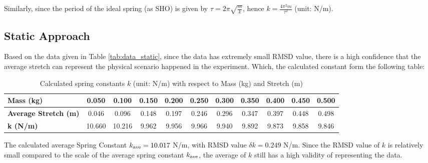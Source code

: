 \documentclass{article}
\begin{document}
Similarly, since the period of the ideal spring (as SHO) is given by $\tau=2\pi\sqrt{\frac{m}{k}}$, hence $k = \frac{4\pi^2 m}{\tau^2}$ (unit: N/m).


\subsection{Static Approach} 
Based on the data given in Table \ref{tab:data_static}, since the data has extremely small RMSD value, there is a high confidence that the average stretch can represent the physical scenario happened in the experiment. Which, the calculated constant form the following table:
\begin{table}[h!]
\centering
\caption{Calculated spring constants $k$ (unit: N/m) with respect to Mass (kg) and Stretch (m)}
\begin{tabular}{l||c|c|c|c|c|c|c|c|c|c}
\toprule
\textbf{Mass (kg)} & 0.050 & 0.100 & 0.150 & 0.200 & 0.250 & 0.300 & 0.350 & 0.400 & 0.450 & 0.500 \\ 
\hline
\textbf{Average Stretch (m)} & 0.046 & 0.096 & 0.148 & 0.197 & 0.246 & 0.296 & 0.347 & 0.397 & 0.448 & 0.498 \\ 
\midrule
\midrule
\textbf{k (N/m)} & 10.660 & 10.216 & 9.962 & 9.956 & 9.966 & 9.940 & 9.892 & 9.873 & 9.858 & 9.846 \\ 
\bottomrule
\end{tabular}
\label{tab:static_k}
\end{table}

The calculated average Spring Constant $k_\textmd{ave} = 10.017$ N/m, with RMSD value $\delta k=0.249$ N/m. Since the RMSD value of $k$ is relatively small compared to the scale of the average spring constant $k_\textmd{ave}$, the average of $k$ still has a high validity of representing the data.

\hfil
\end{document}
